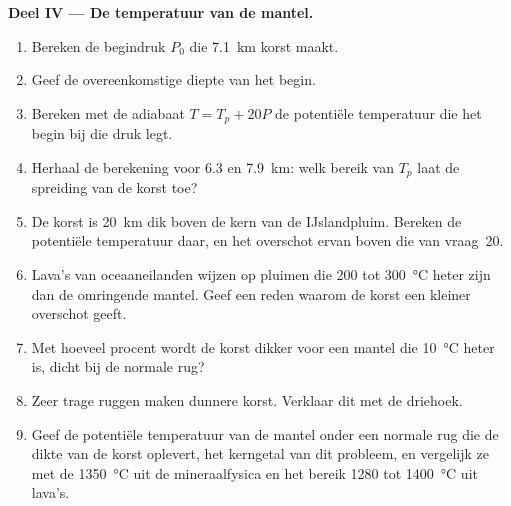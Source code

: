 \begin{problem}
\noindent\textbf{Deel IV --- De temperatuur van de mantel.}
\begin{enumerate}[resume]
\item Bereken de begindruk $P_0$ die \qty{7.1}{km} korst maakt.
\item Geef de overeenkomstige diepte van het begin.
\item Bereken met de adiabaat $T = T_p + 20P$ de potentiële temperatuur die
het begin bij die druk legt.
\item Herhaal de berekening voor 6.3 en \qty{7.9}{km}: welk bereik van $T_p$ laat de
spreiding van de korst toe?
\item De korst is \qty{20}{km} dik boven de kern van de IJslandpluim. Bereken
de potentiële temperatuur daar, en het overschot ervan boven die van vraag~20.
\item Lava's van oceaaneilanden wijzen op pluimen die 200 tot \qty{300}{\celsius} heter zijn dan
de omringende mantel. Geef een reden waarom de korst een kleiner overschot geeft.
\item Met hoeveel procent wordt de korst dikker voor een mantel die \qty{10}{\celsius}
heter is, dicht bij de normale rug?
\item Zeer trage ruggen maken dunnere korst. Verklaar dit met de driehoek.
\item Geef de potentiële temperatuur van de mantel onder een normale rug die
de dikte van de korst oplevert, het kerngetal van dit probleem, en vergelijk
ze met de \qty{1350}{\celsius} uit de mineraalfysica en het bereik 1280 tot
\qty{1400}{\celsius} uit lava's.
\end{enumerate}
\end{problem}
